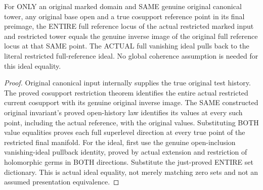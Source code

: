 \begin{theorem}
\label{hir:original-full-reference-whole-open-history-dictionary}
\leanok
{}
For ONLY an original marked domain and SAME genuine original canonical tower,
any original base open and a true cosupport reference point in its final
preimage, the ENTIRE full reference locus of the actual restricted marked
input and restricted tower equals the genuine inverse image of the original
full reference locus at that SAME point. The ACTUAL full vanishing ideal
pulls back to the literal restricted full-reference ideal. No global
coherence assumption is needed for this ideal equality.
\end{theorem}
\begin{proof}
Original canonical input internally supplies the true original test history.
The proved cosupport restriction theorem identifies the entire actual
restricted current cosupport with its genuine original inverse image.
The SAME constructed original invariant's proved open-history law identifies
its values at every such point, including the actual reference, with the
original values. Substituting BOTH value equalities proves each full
superlevel direction at every true point of the restricted final manifold.
For the ideal, first use the genuine open-inclusion vanishing-ideal pullback
identity, proved by actual extension and restriction of holomorphic germs
in BOTH directions. Substitute the just-proved ENTIRE set dictionary. This
is actual ideal equality, not merely matching zero sets and not an assumed
presentation equivalence.
\end{proof}

